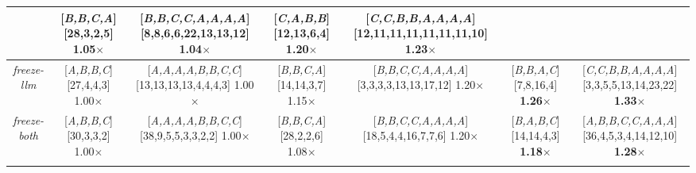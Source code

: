 \documentclass[conference]{IEEEtran}
\begin{document}
\begin{table}[h]
\begin{tabular}{ccc|cc|cc}
\rule{0pt}{20pt} & \makecell{[\textit{B,B,C,A}]\\{[28,3,2,5]}\\1.05$\times$} 
\rule{0pt}{20pt} & \makecell{[\textit{B,B,C,C,A,A,A,A}]\\{[8,8,6,6,22,13,13,12]}\\1.04$\times$} 
\rule{0pt}{20pt} & \makecell{[\textit{C,A,B,B}]\\{[12,13,6,4]}\\ \textbf{1.20$\times$}} 
\rule{0pt}{20pt} & \makecell{[\textit{C,C,B,B,A,A,A,A}]\\{[12,11,11,11,11,11,11,10]}\\ \textbf{1.23$\times$}} \\
\hline
\textit{freeze-llm} 
\rule{0pt}{20pt} & \makecell{[\textit{A,B,B,C}]\\{[27,4,4,3]}\\1.00$\times$} 
\rule{0pt}{20pt} & \makecell{[\textit{A,A,A,A,B,B,C,C}]\\{[13,13,13,13,4,4,4,3]}\\1.00$\times$} 
\rule{0pt}{20pt} & \makecell{[\textit{B,B,C,A}]\\{[14,14,3,7]}\\1.15$\times$} 
\rule{0pt}{20pt} & \makecell{[\textit{B,B,C,C,A,A,A,A}]\\{[3,3,3,3,13,13,17,12]}\\1.20$\times$} 
\rule{0pt}{20pt} & \makecell{[\textit{B,B,A,C}]\\{[7,8,16,4]}\\ \textbf{1.26$\times$}} 
\rule{0pt}{20pt} & \makecell{[\textit{C,C,B,B,A,A,A,A}]\\{[3,3,5,5,13,14,23,22]}\\ \textbf{1.33$\times$}} \\
\hline
\textit{freeze-both} 
\rule{0pt}{20pt} & \makecell{[\textit{A,B,B,C}]\\{[30,3,3,2]}\\1.00$\times$} 
\rule{0pt}{20pt} & \makecell{[\textit{A,A,A,A,B,B,C,C}]\\{[38,9,5,5,3,3,2,2]}\\1.00$\times$} 
\rule{0pt}{20pt} & \makecell{[\textit{B,B,C,A}]\\{[28,2,2,6]}\\1.08$\times$} 
\rule{0pt}{20pt} & \makecell{[\textit{B,B,C,C,A,A,A,A}]\\{[18,5,4,4,16,7,7,6]}\\1.20$\times$} 
\rule{0pt}{20pt} & \makecell{[\textit{B,A,B,C}]\\{[14,14,4,3]}\\ \textbf{1.18$\times$}} 
\rule{0pt}{20pt} & \makecell{[\textit{A,B,B,C,C,A,A,A}]\\{[36,4,5,3,4,14,12,10]}\\ \textbf{1.28$\times$}} \\
\hline
\vspace*{-5mm}
\end{tabular}
\label{tab:partition}
\end{table}
\end{document}
